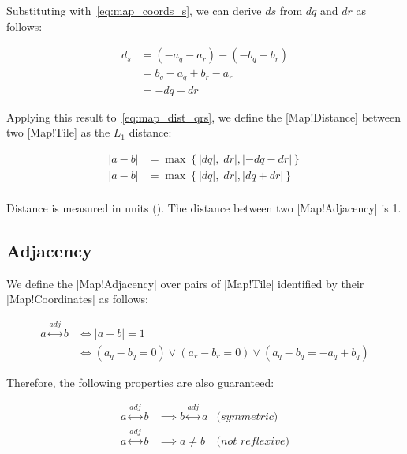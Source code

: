 Substituting with~\eqref{eq:map_coords_s}, we can derive \(ds\) from \(dq\) and \(dr\) as follows:

\begin{align}\label{eq:map_dist_ds}
    d_s &= (-a_q - a_r) - (-b_q - b_r)\nonumber \\
    &= b_q - a_q + b_r - a_r\nonumber \\
    &= -dq - dr
\end{align}

Applying this result to~\eqref{eq:map_dist_qrs}, we define the [Map!Distance] between two [Map!Tile] as the \(L_1\) distance:

\begin{align}\label{eq:map_dist_qr}
    |a - b| &= \max\left \{ |dq|, |dr|, |-dq-dr| \right \}\nonumber \\
    |a - b| &= \max\left \{ |dq|, |dr|, |dq+dr| \right \} \\
\end{align}

Distance is measured in units (\mapunit{}). The distance between two [Map!Adjacency] is \SI{1}{\mapunits}.

\subsection{Adjacency}

We define the [Map!Adjacency] over pairs of [Map!Tile] identified by their [Map!Coordinates] as follows:

\begin{align}\label{eq:map_adj}
    a \overset{adj}{\leftrightarrow} b &\iff |a - b| = 1\\
    &\iff (a_q - b_q = 0)
        \vee (a_r - b_r = 0)
        \vee (a_q - b_q = -a_q + b_q)\nonumber
\end{align}

Therefore, the following properties are also guaranteed:

\begin{align*}
    a \overset{adj}{\leftrightarrow} b &\implies
        b \overset{adj}{\leftrightarrow} a&\textit{(symmetric)}\\
    a \overset{adj}{\leftrightarrow} b &\implies
        a \neq b&\textit{(not reflexive)}
\end{align*}

